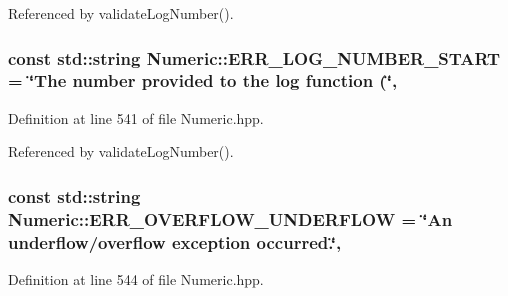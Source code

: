 Referenced by validate\-Log\-Number().

\hypertarget{classmultiscale_1_1Numeric_a88ca9309ade745700dacbdc7c0d713f2}{
\subsubsection[{E\-R\-R\-\_\-\-L\-O\-G\-\_\-\-N\-U\-M\-B\-E\-R\-\_\-\-S\-T\-A\-R\-T}]{\setlength{\rightskip}{0pt plus 5cm}const std\-::string Numeric\-::\-E\-R\-R\-\_\-\-L\-O\-G\-\_\-\-N\-U\-M\-B\-E\-R\-\_\-\-S\-T\-A\-R\-T = \char`\"{}The number provided to the {\bf log} function (\char`\"{}\hspace{0.3cm}{\ttfamily [static]}, {\ttfamily [private]}}}\label{classmultiscale_1_1Numeric_a88ca9309ade745700dacbdc7c0d713f2}


Definition at line 541 of file Numeric.\-hpp.



Referenced by validate\-Log\-Number().

\hypertarget{classmultiscale_1_1Numeric_aa56bde8322d97ccc99c252b951d44a9d}{
\subsubsection[{E\-R\-R\-\_\-\-O\-V\-E\-R\-F\-L\-O\-W\-\_\-\-U\-N\-D\-E\-R\-F\-L\-O\-W}]{\setlength{\rightskip}{0pt plus 5cm}const std\-::string Numeric\-::\-E\-R\-R\-\_\-\-O\-V\-E\-R\-F\-L\-O\-W\-\_\-\-U\-N\-D\-E\-R\-F\-L\-O\-W = \char`\"{}An underflow/overflow exception occurred.\char`\"{}\hspace{0.3cm}{\ttfamily [static]}, {\ttfamily [private]}}}\label{classmultiscale_1_1Numeric_aa56bde8322d97ccc99c252b951d44a9d}


Definition at line 544 of file Numeric.\-hpp.

